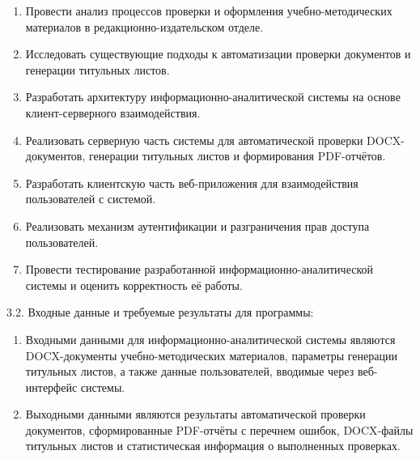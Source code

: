 \begin{enumerate}
	\item Провести анализ процессов проверки и оформления учебно-методических материалов в редакционно-издательском отделе.
	
	\item Исследовать существующие подходы к автоматизации проверки документов и генерации титульных листов.
	
	\item Разработать архитектуру информационно-аналитической системы на основе клиент-серверного взаимодействия.
	
	\item Реализовать серверную часть системы для автоматической проверки DOCX-документов, генерации титульных листов и формирования PDF-отчётов.
	
	\item Разработать клиентскую часть веб-приложения для взаимодействия пользователей с системой.
	
	\item Реализовать механизм аутентификации и разграничения прав доступа пользователей.
	
	\item Провести тестирование разработанной информационно-аналитической системы и оценить корректность её работы.
\end{enumerate}

{\parindent0pt
	
	3.2. Входные данные и требуемые результаты для программы:}

\begin{enumerate}
	\item Входными данными для информационно-аналитической системы являются DOCX-документы учебно-методических материалов, параметры генерации титульных листов, а также данные пользователей, вводимые через веб-интерфейс системы.
	
	\item Выходными данными являются результаты автоматической проверки документов, сформированные PDF-отчёты с перечнем ошибок, DOCX-файлы титульных листов и статистическая информация о выполненных проверках.
\end{enumerate}

